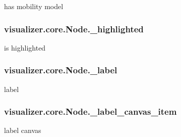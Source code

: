 has mobility model 

\subsubsection[{\texorpdfstring{\+\_\+highlighted}{_highlighted}}]{\setlength{\rightskip}{0pt plus 5cm}visualizer.\+core.\+Node.\+\_\+highlighted\hspace{0.3cm}{\ttfamily [private]}}\hypertarget{classvisualizer_1_1core_1_1Node_a3cd0423bbc9b73387157c06d4cd9eb29}{}\label{classvisualizer_1_1core_1_1Node_a3cd0423bbc9b73387157c06d4cd9eb29}


is highlighted 

\subsubsection[{\texorpdfstring{\+\_\+label}{_label}}]{\setlength{\rightskip}{0pt plus 5cm}visualizer.\+core.\+Node.\+\_\+label\hspace{0.3cm}{\ttfamily [private]}}\hypertarget{classvisualizer_1_1core_1_1Node_a660d23d39d781ab142f12f329690d018}{}\label{classvisualizer_1_1core_1_1Node_a660d23d39d781ab142f12f329690d018}


label 

\subsubsection[{\texorpdfstring{\+\_\+label\+\_\+canvas\+\_\+item}{_label_canvas_item}}]{\setlength{\rightskip}{0pt plus 5cm}visualizer.\+core.\+Node.\+\_\+label\+\_\+canvas\+\_\+item\hspace{0.3cm}{\ttfamily [private]}}\hypertarget{classvisualizer_1_1core_1_1Node_a44add8bc589dc3ff89f0bf26fa2db201}{}\label{classvisualizer_1_1core_1_1Node_a44add8bc589dc3ff89f0bf26fa2db201}


label canvas 


